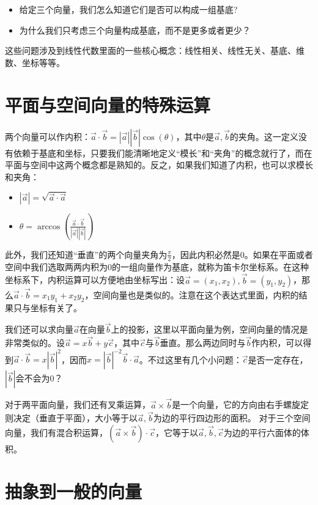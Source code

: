 \documentclass[hyperref,]{ctexart}
\providecommand{\tightlist}{%
  \setlength{\itemsep}{0pt}\setlength{\parskip}{0pt}}
\begin{document}
\begin{itemize}
\tightlist
\item
  给定三个向量，我们怎么知道它们是否可以构成一组基底?
\item
  为什么我们只考虑三个向量构成基底，而不是更多或者更少？
\end{itemize}

这些问题涉及到线性代数里面的一些核心概念：线性相关、线性无关、基底、维数、坐标等等。

\section{平面与空间向量的特殊运算}

两个向量可以作内积：\(\vec{a}\cdot \vec{b}=|\vec{a}||\vec{b}|\cos(\theta)\)，其中\(\theta\)是\(\vec{a},\vec{b}\)的夹角。这一定义没有依赖于基底和坐标，只要我们能清晰地定义``模长''和``夹角''的概念就行了，而在平面与空间中这两个概念都是熟知的。反之，如果我们知道了内积，也可以求模长和夹角：

\begin{itemize}
\tightlist
\item
  \(|\vec{a}| = \sqrt{\vec{a}\cdot\vec{a}}\)
\item
  \(\theta = \arccos(\frac{\vec{a}\cdot\vec{b}}{|\vec{a}||\vec{b}|})\)
\end{itemize}

此外，我们还知道``垂直''的两个向量夹角为\(\frac{\pi}{2}\)，因此内积必然是0。如果在平面或者空间中我们选取两两内积为0的一组向量作为基底，就称为笛卡尔坐标系。在这种坐标系下，内积运算可以方便地由坐标写出：设\(\vec{a}=(x_1,x_2),\vec{b}=(y_1,y_2)\)，那么\(\vec{a}\cdot\vec{b}=x_1y_1+x_2y_2\)，空间向量也是类似的。注意在这个表达式里面，内积的结果只与坐标有关了。

我们还可以求向量\(\vec{a}\)在向量\(\vec{b}\)上的投影，这里以平面向量为例，空间向量的情况是非常类似的。设\(\vec{a}=x\vec{b}+y\vec{c}\)，其中\(\vec{c}\)与\(\vec{b}\)垂直。那么两边同时与\(\vec{b}\)作内积，可以得到\(\vec{a}\cdot\vec{b}=x|\vec{b}|^2\)，因而\(x=|\vec{b}|^{-2}\vec{b}\cdot\vec{a}\)。不过这里有几个小问题：\(\vec{c}\)是否一定存在，\(|\vec{b}|\)会不会为0？

对于两平面向量，我们还有叉乘运算，\(\vec{a}\times\vec{b}\)是一个向量，它的方向由右手螺旋定则决定（垂直于平面），大小等于以\(\vec{a},\vec{b}\)为边的平行四边形的面积。
对于三个空间向量，我们有混合积运算，\((\vec{a}\times\vec{b})\cdot\vec{c}\)，它等于以\(\vec{a},\vec{b},\vec{c}\)为边的平行六面体的体积。

\section{抽象到一般的向量}
\end{document}
